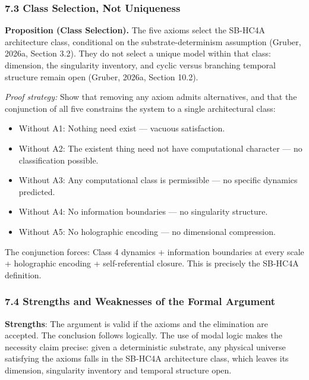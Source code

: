 \documentclass[
]{article}
\providecommand{\tightlist}{%
  \setlength{\itemsep}{0pt}\setlength{\parskip}{0pt}}
\begin{document}
\hypertarget{class-selection-not-uniqueness}{%
\subsubsection{7.3 Class Selection, Not
Uniqueness}\label{class-selection-not-uniqueness}}

\textbf{Proposition (Class Selection).} The five axioms select the
SB-HC4A architecture class, conditional on the substrate-determinism
assumption (Gruber, 2026a, Section 3.2). They do not select a unique
model within that class: dimension, the singularity inventory, and
cyclic versus branching temporal structure remain open (Gruber, 2026a,
Section 10.2).

\emph{Proof strategy:} Show that removing any axiom admits alternatives,
and that the conjunction of all five constrains the system to a single
architectural class:

\begin{itemize}
\tightlist
\item
  Without A1: Nothing need exist --- vacuous satisfaction.
\item
  Without A2: The existent thing need not have computational character
  --- no classification possible.
\item
  Without A3: Any computational class is permissible --- no specific
  dynamics predicted.
\item
  Without A4: No information boundaries --- no singularity structure.
\item
  Without A5: No holographic encoding --- no dimensional compression.
\end{itemize}

The conjunction forces: Class 4 dynamics + information boundaries at
every scale + holographic encoding + self-referential closure. This is
precisely the SB-HC4A definition.

\hypertarget{strengths-and-weaknesses-of-the-formal-argument}{%
\subsubsection{7.4 Strengths and Weaknesses of the Formal
Argument}\label{strengths-and-weaknesses-of-the-formal-argument}}

\textbf{Strengths}: The argument is valid if the axioms and the
elimination are accepted. The conclusion follows logically. The use of
modal logic makes the necessity claim precise: given a deterministic
substrate, any physical universe satisfying the axioms falls in the
SB-HC4A architecture class, which leaves its dimension, singularity
inventory and temporal structure open.
\end{document}
